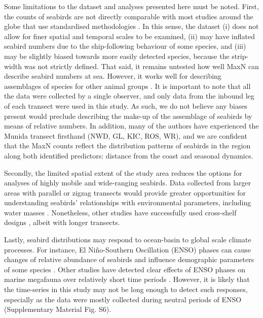 \documentclass[preprint, 3p, authoryear]{elsarticle} %
\begin{document}
Some limitations to the dataset and analyses presented here must be noted. First, the counts of seabirds are not directly comparable with most studies around the globe that use standardised methodologies \citep[e.g.][]{tasker1984}. In this sense, the dataset (i) does not allow for finer spatial and temporal scales to be examined, (ii) may have inflated seabird numbers due to the ship-following behaviour of some species, and (iii) may be slightly biased towards more easily detected species, because the strip-width was not strictly defined. That said, it remains untested how well MaxN can describe seabird numbers at sea. However, it works well for describing assemblages of species for other animal groups \citep[e.g.][]{willis2000, harvey2007}. It is important to note that all the data were collected by a single observer, and only data from the inbound leg of each transect were used in this study. As such, we do not believe any biases present would preclude describing the make-up of the assemblage of seabirds by means of relative numbers. In addition, many of the authors have experienced the Munida transect firsthand (NWD, GL, KIC, ROS, WR), and we are confident that the MaxN counts reflect the distribution patterns of seabirds in the region along both identified predictors: distance from the coast and seasonal dynamics.

Secondly, the limited spatial extent of the study area reduces the options for analyses of highly mobile and wide-ranging seabirds. Data collected from larger areas with parallel or zigzag transects would provide greater opportunities for understanding seabirds' relationships with environmental parameters, including water masses \citep[e.g.][]{woehler2010, evans2021, gall2022}. Nonetheless, other studies have successfully used cross-shelf designs \citep{hunt2014, cushing2024}, albeit with longer transects.

Lastly, seabird distributions may respond to ocean-basin to global scale climate processes. For instance, El Niño-Southern Oscillation (ENSO) phases can cause changes of relative abundance of seabirds \citep{tershy1991} and influence demographic parameters of some species \citep{price2020}. Other studies have detected clear effects of ENSO phases on marine megafauna over relatively short time periods \citep[e.g.][]{sprogis2017}. However, it is likely that the time-series in this study may not be long enough to detect such responses, especially as the data were mostly collected during neutral periods of ENSO (Supplementary Material Fig. S6).
\end{document}
